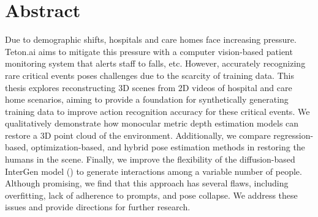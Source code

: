\section*{Abstract}
Due to demographic shifts, hospitals and care homes face increasing pressure. Teton.ai aims to mitigate this pressure with a computer vision-based patient monitoring system that alerts staff to falls, etc. However, accurately recognizing rare critical events poses challenges due to the scarcity of training data. This thesis explores reconstructing 3D scenes from 2D videos of hospital and care home scenarios, aiming to provide a foundation for synthetically generating training data to improve action recognition accuracy for these critical events. We qualitatively demonstrate how monocular metric depth estimation models can restore a 3D point cloud of the environment. Additionally, we compare regression-based, optimization-based, and hybrid pose estimation methods in restoring the humans in the scene. Finally, we improve the flexibility of the diffusion-based InterGen model (\cite{liang2024intergen}) to generate interactions among a variable number of people. Although promising, we find that this approach has several flaws, including overfitting, lack of adherence to prompts, and pose collapse. We address these issues and provide directions for further research.